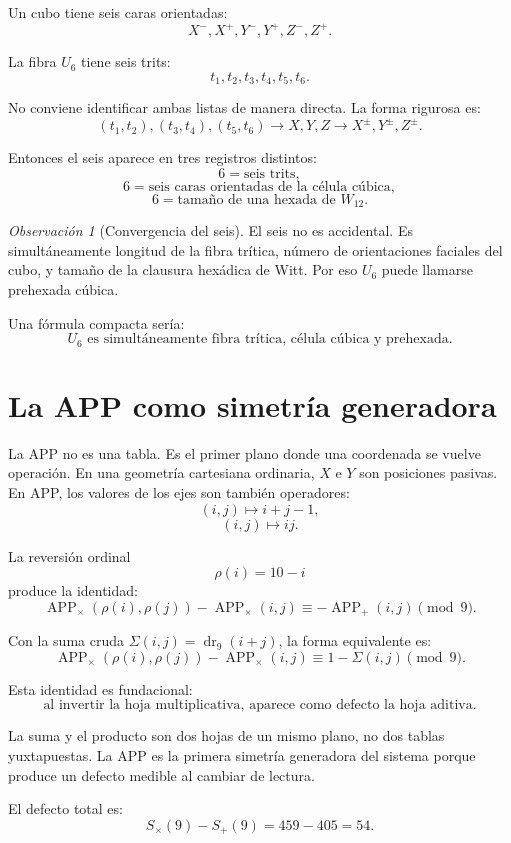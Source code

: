 \documentclass[11pt,a4paper]{article}
\theoremstyle{definition}
\theoremstyle{remark}
\newtheorem{observacion}[teorema]{Observación}
\newcommand{\APP}{\operatorname{APP}}
\newcommand{\dr}{\operatorname{dr}_9}
\begin{document}
Un cubo tiene seis caras orientadas:
\[
X^-,X^+,Y^-,Y^+,Z^-,Z^+.
\]

La fibra \(U_6\) tiene seis trits:
\[
t_1,t_2,t_3,t_4,t_5,t_6.
\]

No conviene identificar ambas listas de manera directa. La forma rigurosa es:
\[
(t_1,t_2),(t_3,t_4),(t_5,t_6)
\longrightarrow
X,Y,Z
\longrightarrow
X^\pm,Y^\pm,Z^\pm.
\]

Entonces el seis aparece en tres registros distintos:
\[
6=\text{seis trits},
\]
\[
6=\text{seis caras orientadas de la célula cúbica},
\]
\[
6=\text{tamaño de una hexada de }W_{12}.
\]

\begin{observacion}[Convergencia del seis]
El seis no es accidental. Es simultáneamente longitud de la fibra trítica, número de orientaciones faciales del cubo, y tamaño de la clausura hexádica de Witt. Por eso \(U_6\) puede llamarse prehexada cúbica.
\end{observacion}

Una fórmula compacta sería:
\[
\boxed{
U_6\text{ es simultáneamente fibra trítica, célula cúbica y prehexada.}
}
\]

\section{La APP como simetría generadora}

La APP no es una tabla. Es el primer plano donde una coordenada se vuelve operación. En una geometría cartesiana ordinaria, \(X\) e \(Y\) son posiciones pasivas. En APP, los valores de los ejes son también operadores:
\[
(i,j)\mapsto i+j-1,
\]
\[
(i,j)\mapsto ij.
\]

La reversión ordinal
\[
\rho(i)=10-i
\]
produce la identidad:
\[
\boxed{
\APP_\times(\rho(i),\rho(j))-\APP_\times(i,j)\equiv-\APP_+(i,j)\pmod9.
}
\]

Con la suma cruda \(\Sigma(i,j)=\dr(i+j)\), la forma equivalente es:
\[
\APP_\times(\rho(i),\rho(j))-\APP_\times(i,j)
\equiv 1-\Sigma(i,j)\pmod9.
\]

Esta identidad es fundacional:
\[
\boxed{
\text{al invertir la hoja multiplicativa, aparece como defecto la hoja aditiva.}
}
\]

La suma y el producto son dos hojas de un mismo plano, no dos tablas yuxtapuestas. La APP es la primera simetría generadora del sistema porque produce un defecto medible al cambiar de lectura.

El defecto total es:
\[
S_\times(9)-S_+(9)=459-405=54.
\]
\end{document}

